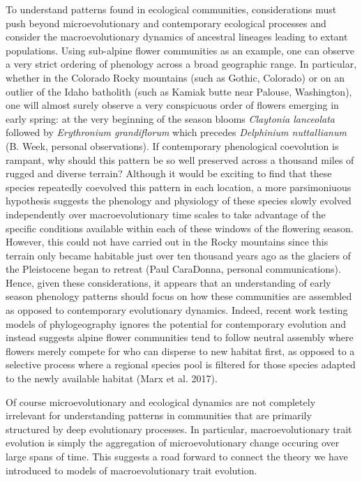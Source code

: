\documentclass[]{article}
\begin{document}
To understand patterns found in ecological communities, considerations
must push beyond microevolutionary and contemporary ecological processes
and consider the macroevolutionary dynamics of ancestral lineages
leading to extant populations. Using sub-alpine flower communities as an
example, one can observe a very strict ordering of phenology across a
broad geographic range. In particular, whether in the Colorado Rocky
mountains (such as Gothic, Colorado) or on an outlier of the Idaho
batholith (such as Kamiak butte near Palouse, Washington), one will
almost surely observe a very conspicuous order of flowers emerging in
early spring: at the very beginning of the season blooms \emph{Claytonia
lanceolata} followed by \emph{Erythronium grandiflorum} which precedes
\emph{Delphinium nuttallianum} (B. Week, personal observations). If
contemporary phenological coevolution is rampant, why should this
pattern be so well preserved across a thousand miles of rugged and
diverse terrain? Although it would be exciting to find that these
species repeatedly coevolved this pattern in each location, a more
parsimoniuous hypothesis suggests the phenology and physiology of these
species slowly evolved independently over macroevolutionary time scales
to take advantage of the specific conditions available within each of
these windows of the flowering season. However, this could not have
carried out in the Rocky mountains since this terrain only became
habitable just over ten thousand years ago as the glaciers of the
Pleistocene began to retreat (Paul CaraDonna, personal communications).
Hence, given these considerations, it appears that an understanding of
early season phenology patterns should focus on how these communities
are assembled as opposed to contemporary evolutionary dynamics. Indeed,
recent work testing models of phylogeography ignores the potential for
contemporary evolution and instead suggests alpine flower communities
tend to follow neutral assembly where flowers merely compete for who can
disperse to new habitat first, as opposed to a selective process where a
regional species pool is filtered for those species adapted to the newly
available habitat (Marx et al. 2017).

Of course microevolutionary and ecological dynamics are not completely
irrelevant for understanding patterns in communities that are primarily
structured by deep evolutionary processes. In particular,
macroevolutionary trait evolution is simply the aggregation of
microevolutionary change occuring over large spans of time. This
suggests a road forward to connect the theory we have introduced to
models of macroevolutionary trait evolution.
\end{document}
